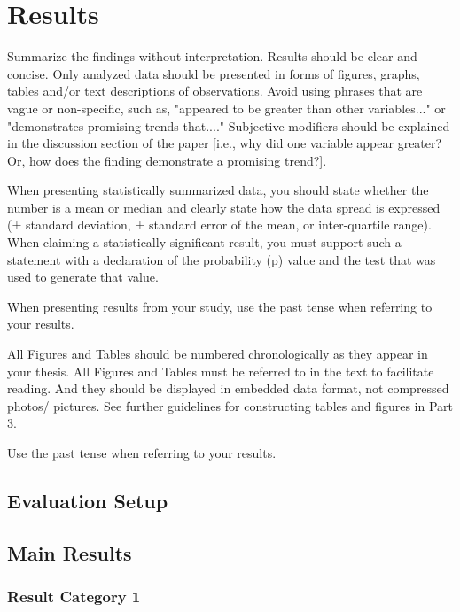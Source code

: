 \chapter{Results}

Summarize the findings without interpretation. Results should be clear and concise. Only analyzed data should be presented in forms of figures, graphs, tables and/or text descriptions of observations. Avoid using phrases that are vague or non-specific, such as, "appeared to be greater than other variables..." or "demonstrates promising trends that...." Subjective modifiers should be explained in the discussion section of the paper [i.e., why did one variable appear greater? Or, how does the finding demonstrate a promising trend?].

When presenting statistically summarized data, you should state whether the number is a mean or median and clearly state how the data spread is expressed (± standard deviation, ± standard error of the mean, or inter-quartile range). When claiming a statistically significant result, you must support such a statement with a declaration of the probability (p) value and the test that was used to generate that value. 

When presenting results from your study, use the past tense when referring to your results.

All Figures and Tables should be numbered chronologically as they appear in your thesis. All Figures and Tables must be referred to in the text to facilitate reading. And they should be displayed in embedded data format, not compressed photos/ pictures. See further guidelines for constructing tables and figures in Part 3. 

Use the past tense when referring to your results.


\section{Evaluation Setup}


\section{Main Results}

\subsection{Result Category 1}

